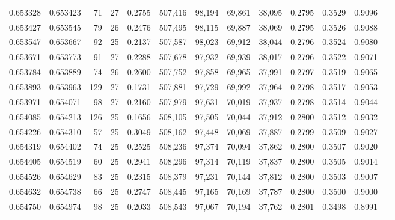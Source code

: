 \begin{tabular}{rrrrrrrrrrrrr}
0.653328 & 0.653423 &    71 &  27 &                                     0.2755 & 507,416 &  98,194 &  69,861 &  38,095 & 0.2795 & 0.3529 & 0.9096 \\
0.653427 & 0.653545 &    79 &  26 &                                     0.2476 & 507,495 &  98,115 &  69,887 &  38,069 & 0.2795 & 0.3526 & 0.9088 \\
0.653547 & 0.653667 &    92 &  25 &                                     0.2137 & 507,587 &  98,023 &  69,912 &  38,044 & 0.2796 & 0.3524 & 0.9080 \\
0.653671 & 0.653773 &    91 &  27 &                                     0.2288 & 507,678 &  97,932 &  69,939 &  38,017 & 0.2796 & 0.3522 & 0.9071 \\
0.653784 & 0.653889 &    74 &  26 &                                     0.2600 & 507,752 &  97,858 &  69,965 &  37,991 & 0.2797 & 0.3519 & 0.9065 \\
0.653893 & 0.653963 &   129 &  27 &                                     0.1731 & 507,881 &  97,729 &  69,992 &  37,964 & 0.2798 & 0.3517 & 0.9053 \\
0.653971 & 0.654071 &    98 &  27 &                                     0.2160 & 507,979 &  97,631 &  70,019 &  37,937 & 0.2798 & 0.3514 & 0.9044 \\
0.654085 & 0.654213 &   126 &  25 &                                     0.1656 & 508,105 &  97,505 &  70,044 &  37,912 & 0.2800 & 0.3512 & 0.9032 \\
0.654226 & 0.654310 &    57 &  25 &                                     0.3049 & 508,162 &  97,448 &  70,069 &  37,887 & 0.2799 & 0.3509 & 0.9027 \\
0.654319 & 0.654402 &    74 &  25 &                                     0.2525 & 508,236 &  97,374 &  70,094 &  37,862 & 0.2800 & 0.3507 & 0.9020 \\
0.654405 & 0.654519 &    60 &  25 &                                     0.2941 & 508,296 &  97,314 &  70,119 &  37,837 & 0.2800 & 0.3505 & 0.9014 \\
0.654526 & 0.654629 &    83 &  25 &                                     0.2315 & 508,379 &  97,231 &  70,144 &  37,812 & 0.2800 & 0.3503 & 0.9007 \\
0.654632 & 0.654738 &    66 &  25 &                                     0.2747 & 508,445 &  97,165 &  70,169 &  37,787 & 0.2800 & 0.3500 & 0.9000 \\
0.654750 & 0.654974 &    98 &  25 &                                     0.2033 & 508,543 &  97,067 &  70,194 &  37,762 & 0.2801 & 0.3498 & 0.8991 \\

\end{tabular}
